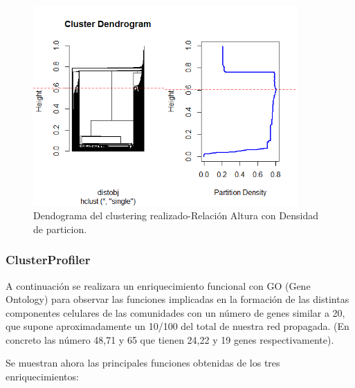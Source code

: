 \begin{figure}[h]
	\centering
	\includegraphics[width=0.90\textwidth]{figures/Grapichs_LinkComm.png}
	\caption{Dendograma del clustering realizado-Relación Altura con Densidad de particion. }
	\label{fig:string1}
\end{figure}

\hfill

\subsubsection{ClusterProfiler}

A continuación se realizara un enriquecimiento funcional con GO (Gene Ontology) para observar las funciones implicadas en la formación de las distintas componentes celulares de las comunidades con un número de genes similar a 20, que supone aproximadamente un 10/100 del total de nuestra red propagada. (En concreto las número 48,71 y 65 que tienen 24,22 y 19 genes respectivamente).

\hfill

Se muestran ahora las principales funciones obtenidas de los tres enriquecimientos:



\hfill
